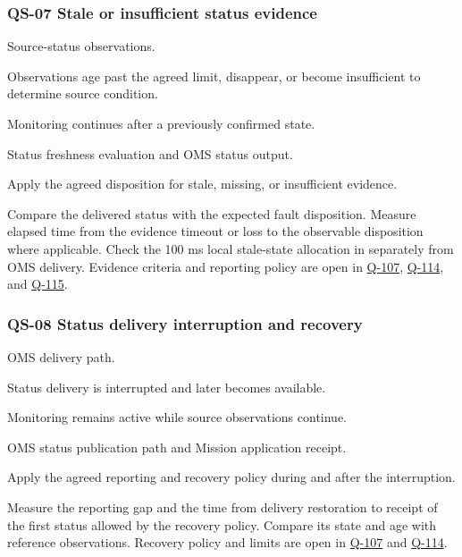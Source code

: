 \subsubsection{QS-07 Stale or insufficient status evidence}
\label{Scenario:QS-07}
\begin{description}[leftmargin=0pt,labelindent=0pt,labelsep=0pt,style=nextline]
\item[Stimulus source] Source-status observations.
\item[Stimulus] Observations age past the agreed limit, disappear, or become insufficient to determine source condition.
\item[Environment] Monitoring continues after a previously confirmed state.
\item[Artifact] Status freshness evaluation and OMS status output.
\item[Response] Apply the agreed disposition for stale, missing, or insufficient evidence.
\item[Response measure] Compare the delivered status with the expected fault disposition. Measure elapsed time from the evidence timeout or loss to the observable disposition where applicable. Check the 100 ms local stale-state allocation in  separately from OMS delivery. Evidence criteria and reporting policy are open in \hyperref[Question:Q-107]{Q-107}, \hyperref[Question:Q-114]{Q-114}, and \hyperref[Question:Q-115]{Q-115}.
\end{description}

\subsubsection{QS-08 Status delivery interruption and recovery}
\label{Scenario:QS-08}
\begin{description}[leftmargin=0pt,labelindent=0pt,labelsep=0pt,style=nextline]
\item[Stimulus source] OMS delivery path.
\item[Stimulus] Status delivery is interrupted and later becomes available.
\item[Environment] Monitoring remains active while source observations continue.
\item[Artifact] OMS status publication path and Mission application receipt.
\item[Response] Apply the agreed reporting and recovery policy during and after the interruption.
\item[Response measure] Measure the reporting gap and the time from delivery restoration to receipt of the first status allowed by the recovery policy. Compare its state and age with reference observations. Recovery policy and limits are open in \hyperref[Question:Q-107]{Q-107} and \hyperref[Question:Q-114]{Q-114}.
\end{description}

